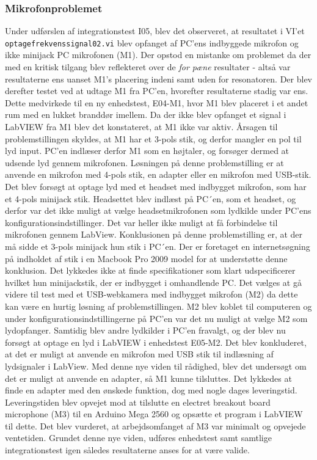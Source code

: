 \subsubsection{Mikrofonproblemet}
Under udførslen af integrationstest I05, blev det observeret, at resultatet i VI'et \texttt{optagefrekvenssignal02.vi} blev opfanget af PC'ens indbyggede mikrofon og ikke minijack PC mikrofonen (M1). Der opstod en mistanke om problemet da der med en kritisk tilgang blev reflekteret over de \textit{for pæne} resultater - altså var resultaterne ens uanset M1's placering indeni samt uden for resonatoren. Der blev derefter testet ved at udtage M1 fra PC'en, hvorefter resultaterne stadig var ens. Dette medvirkede til en ny enhedstest, E04-M1, hvor M1 blev placeret i et andet rum med en lukket branddør imellem. Da der ikke blev opfanget et signal i LabVIEW fra M1 blev det konstateret, at M1 ikke var aktiv. Årsagen til problemstillingen skyldes, at M1 har et 3-pols stik, og derfor mangler en pol til lyd input. PC'en indlæser derfor M1 som en højtaler, og forsøger dermed at udsende lyd gennem mikrofonen. 
Løsningen på denne problemstilling er at anvende en mikrofon med 4-pols stik, en adapter eller en mikrofon med USB-stik.
Det blev forsøgt at optage lyd med et headset med indbygget mikrofon, som har et 4-pols minijack stik. Headsettet blev indlæst på PC´en, som et headset, og derfor var det ikke muligt at vælge headsetmikrofonen som lydkilde under PC'ens konfigurationsindstillinger. Det var heller ikke muligt at få forbindelse til mikrofonen gennem LabView. Konklusionen på denne problemstilling er, at der må sidde et 3-pols minijack hun stik i PC´en. Der er foretaget en internetsøgning på indholdet af stik i en Macbook Pro 2009 model for at understøtte denne konklusion. Det lykkedes ikke at finde specifikationer som klart udspecificerer hvilket hun minijackstik, der er indbygget i omhandlende PC. Det vælges at gå videre til test med et USB-webkamera med indbygget mikrofon (M2) da dette kan være en hurtig løsning af problemstillingen. M2 blev koblet til computeren og under konfigurationsindstillingerne på PC'en var det nu muligt at vælge M2 som lydopfanger. Samtidig blev andre lydkilder i PC'en fravalgt, og der blev nu forsøgt at optage en lyd i LabVIEW i enhedstest E05-M2. Det blev konkluderet, at det er muligt at anvende en mikrofon med USB stik til indlæsning af lydsignaler i LabView. Med denne nye viden til rådighed, blev det undersøgt om det er muligt at anvende en adapter, så M1 kunne tilsluttes. Det lykkedes at finde en adapter med den ønskede funktion, dog med nogle dages leveringstid. Leveringstiden blev opvejet mod at tilslutte en electret breakout board microphone (M3) til en Arduino Mega 2560 og opsætte et program i LabVIEW til dette. Det blev vurderet, at arbejdsomfanget af M3 var minimalt og opvejede ventetiden.
Grundet denne nye viden, udføres enhedstest samt samtlige integrationstest igen således resultaterne anses for at være valide. 

